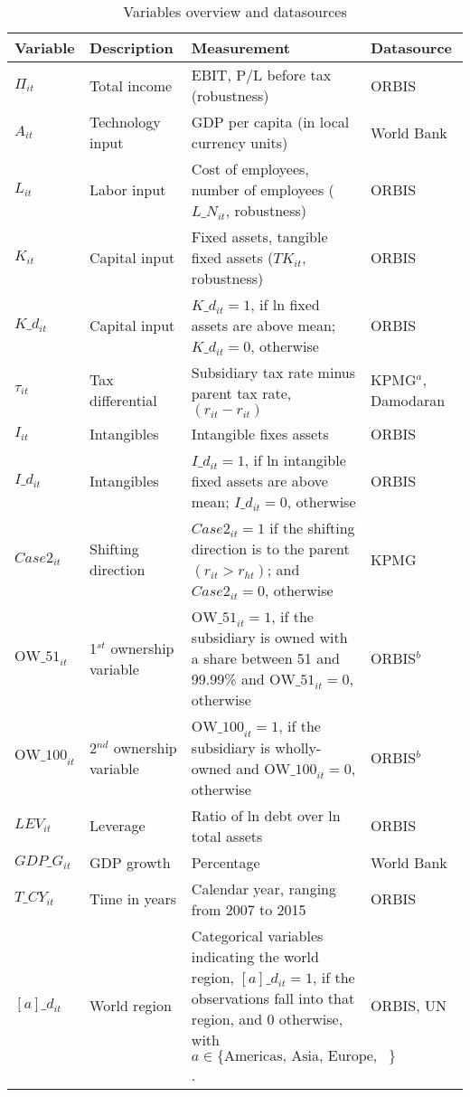 \documentclass[10pt,twocolumn,oneside,cmyk]{article}
\begin{document}
\begin{table*}[t]
\footnotesize
 \begin{center}
  \caption{Variables overview and datasources}\label{tab19}
   \begin{tabularx}{\linewidth}{l l X l}
   \toprule
   Variable &Description &Measurement &Datasource\\
   \midrule
   $\Pi_{it}$ &Total income &EBIT, P/L before tax (robustness) &ORBIS\\
   $A_{it}$ &Technology input &GDP per capita (in local currency units) &World Bank\\
   $L_{it}$ &Labor input &Cost of employees, number of employees ($L\_N_{it}$, robustness) &ORBIS\\
   $K_{it}$ &Capital input &Fixed assets, tangible fixed assets ($TK_{it}$, robustness) &ORBIS\\
   $K \_d_{it}$ &Capital input &$K \_d_{it}=1$, if ln fixed assets are above mean; $K \_d_{it}=0$, otherwise &ORBIS\\
   $\tau_{it}$ &Tax differential &Subsidiary tax rate minus parent tax rate, $(r_{it}-r_{it})$ &KPMG$^a$, Damodaran\\
   $I_{it}$ &Intangibles &Intangible fixes assets &ORBIS\\
   $I \_d_{it}$ &Intangibles &$I \_d_{it}=1$, if ln intangible fixed assets are above mean; $I \_d_{it}=0$, otherwise &ORBIS\\
   $Case2_{it}$ &Shifting direction &$Case2_{it}=1$ if the shifting direction is to the parent $(r_{it}>r_{ht})$; and $Case2_{it}=0$, otherwise &KPMG\\
   $\text{OW\_51}_{it}$ &1$^{st}$ ownership variable &$\text{OW\_51}_{it}=1$, if the subsidiary is owned with a share between 51 and 99.99\% and $\text{OW\_51}_{it}=0$, otherwise &ORBIS$^b$\\
   $\text{OW\_100}_{it}$ &2$^{nd}$ ownership variable &$\text{OW\_100}_{it}=1$, if the subsidiary is wholly-owned and $\text{OW\_100}_{it}=0$, otherwise &ORBIS$^b$\\
   $LEV_{it}$ &Leverage &Ratio of ln debt over ln total assets &ORBIS\\
   $GDP\_G_{it}$ &GDP growth &Percentage &World Bank\\
   $T\_CY_{it}$ &Time in years &Calendar year, ranging from 2007 to 2015 &ORBIS\\
   $[a]\_d_{it}$ &World region &Categorical variables indicating the world region, $[a]\_d_{it}=1$, if the observations fall into that region, and 0 otherwise, with $a\in \{\text{Americas, Asia, Europe, Oceania}\}$. &ORBIS, UN\\

\end{tabularx}
\end{center}
\end{table*}
\end{document}
